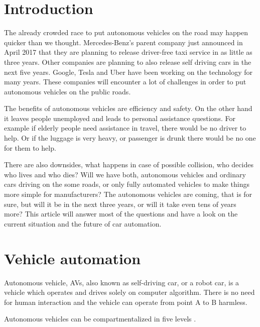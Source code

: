 \documentclass[english]{tktltiki}
\begin{document}
\mytableofcontents

\section{Introduction}
The already crowded race to put autonomous vehicles on the road may happen 
quicker than we thought. Mercedes-Benz's parent company just announced in April 
2017 that they are planning to release driver-free taxi service in as little as 
three years. Other companies are planning to also release self 
driving cars in the next five years. Google, Tesla and Uber have been working on 
the technology for many years. These companies will encounter a lot of 
challenges in order to put autonomous vehicles on the public roads. 

The benefits of autonomous vehicles are efficiency and safety. On the other hand it leaves 
people unemployed and leads to personal assistance questions. For example if 
elderly people need assistance in travel, there would be no driver to help. Or 
if the luggage is very heavy, or passenger is drunk there would be no one for 
them to help. 

There are also downsides, what happens in case of possible collision, who 
decides who lives and who dies? Will we have both, autonomous vehicles and 
ordinary cars driving on the some roads, or only fully automated vehicles to 
make things more simple for manufacturers? The autonomous vehicles are coming, 
that is for sure, but will it be in the next three years, or will it take even 
tens of years more? This article will answer most of the questions and have a 
look on the current situation and the future of car automation.

\section{Vehicle automation}
Autonomous vehicle, AVs, also known as self-driving car, or a robot car, is a 
vehicle which operates and drives solely on computer algorithm. There is no need 
for human interaction and the vehicle can operate from point A to B harmless. 

Autonomous vehicles can be compartmentalized in five levels \cite{transportpolicy}.
\end{document}
